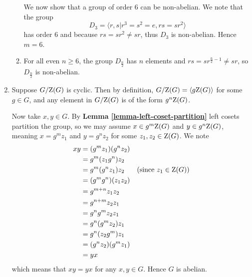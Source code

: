 \begin{enumerate}
\begin{enumerate}[label=(\alph*)]
        We now show that a group of order 6 can be non-abelian. We note that the group
        \[
            D_3 =  \langle r, s \vert r^3 = s^2 = e, rs = sr^2\rangle
        \]
        has order 6 and because $rs = sr^2 \neq sr$, thus $D_3$ is non-abelian. Hence $m = 6$.

        \item For all even $n \geq 6$, the group $D_{\frac n2}$ has $n$ elements and $rs = sr^{\frac n2 - 1} \neq sr$, so $D_{\frac n2}$ is non-abelian.
    \end{enumerate}

    \item Suppose $G / \mathrm{Z}(G)$ is cyclic. Then by definition, $G / \mathrm{Z}(G) = \langle g\mathrm{Z}(G)\rangle$ for some $g \in G$, and any element in $G/\mathrm{Z}(G)$ is of the form $g^n\mathrm{Z}(G)$.

    Now take $x, y \in G$. By \textbf{Lemma \ref{lemma-left-coset-partition}} left cosets partition the group, so we may assume $x \in g^m\mathrm{Z}(G)$ and $y \in g^n\mathrm{Z}(G)$, meaning $x = g^mz_1$ and $y = g^nz_2$ for some $z_1, z_2 \in \mathrm{Z}(G)$. We note
    \begin{align*}
        xy &= (g^mz_1)(g^nz_2)\\
        &= g^m(z_1g^n)z_2\\
        &= g^m(g^nz_1)z_2 & \text{(since }z_1 \in \mathrm{Z}(G))\\
        &= (g^mg^n)(z_1z_2)\\
        &= g^{m+n}z_1z_2\\
        &= g^{n+m}z_2z_1\\
        &= g^ng^mz_2z_1\\
        &= g^n(g^mz_2)z_1\\
        &= g^n(z_2g^m)z_1\\
        &= (g^nz_2)(g^mz_1)\\
        &= yx
    \end{align*}
    which means that $xy = yx$ for any $x, y \in G$. Hence $G$ is abelian.
\end{enumerate}

